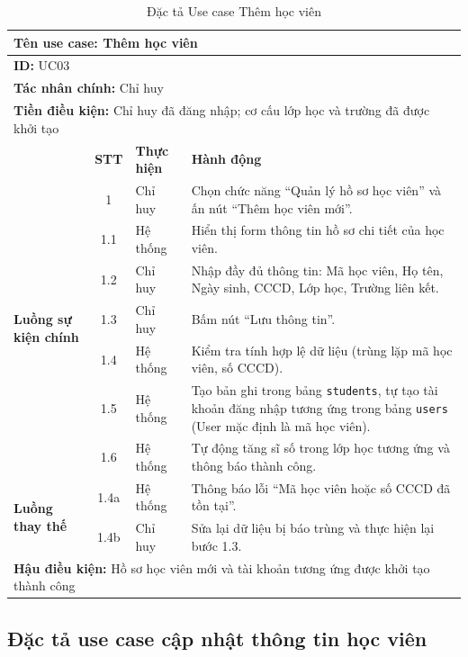 \documentclass[../DoAn.tex]{subfiles}
\begin{document}
\begin{table}[H]
\centering
\small
\renewcommand{\arraystretch}{1.2}
\begin{tabular}{|p{2.2cm}|c|p{2cm}|p{8.5cm}|}
\hline
\multicolumn{4}{|l|}{\textbf{Tên use case:} Thêm học viên} \\ \hline
\multicolumn{4}{|l|}{\textbf{ID:} UC03} \\ \hline
\multicolumn{4}{|l|}{\textbf{Tác nhân chính:} Chỉ huy} \\ \hline
\multicolumn{4}{|l|}{\textbf{Tiền điều kiện:} Chỉ huy đã đăng nhập; cơ cấu lớp học và trường đã được khởi tạo} \\ \hline
 & \textbf{STT} & \textbf{Thực hiện} & \textbf{Hành động} \\ \hline
\multirow{7}{2.2cm}{\textbf{Luồng sự kiện chính}} 
& 1 & Chỉ huy & Chọn chức năng ``Quản lý hồ sơ học viên'' và ấn nút ``Thêm học viên mới''. \\ \cline{2-4}
& 1.1 & Hệ thống & Hiển thị form thông tin hồ sơ chi tiết của học viên. \\ \cline{2-4}
& 1.2 & Chỉ huy & Nhập đầy đủ thông tin: Mã học viên, Họ tên, Ngày sinh, CCCD, Lớp học, Trường liên kết. \\ \cline{2-4}
& 1.3 & Chỉ huy & Bấm nút ``Lưu thông tin''. \\ \cline{2-4}
& 1.4 & Hệ thống & Kiểm tra tính hợp lệ dữ liệu (trùng lặp mã học viên, số CCCD). \\ \cline{2-4}
& 1.5 & Hệ thống & Tạo bản ghi trong bảng \texttt{students}, tự tạo tài khoản đăng nhập tương ứng trong bảng \texttt{users} (User mặc định là mã học viên). \\ \cline{2-4}
& 1.6 & Hệ thống & Tự động tăng sĩ số trong lớp học tương ứng và thông báo thành công. \\ \hline
\multirow{2}{2.2cm}{\textbf{Luồng thay thế}} 
& 1.4a & Hệ thống & Thông báo lỗi ``Mã học viên hoặc số CCCD đã tồn tại''. \\ \cline{2-4}
& 1.4b & Chỉ huy & Sửa lại dữ liệu bị báo trùng và thực hiện lại bước 1.3. \\ \hline
\multicolumn{4}{|l|}{\textbf{Hậu điều kiện:} Hồ sơ học viên mới và tài khoản tương ứng được khởi tạo thành công} \\ \hline
\end{tabular}
\caption{Đặc tả Use case Thêm học viên}
\label{table:uc_add_student}
\end{table}




\subsection{Đặc tả use case cập nhật thông tin học viên}
\hfill
\end{document}
